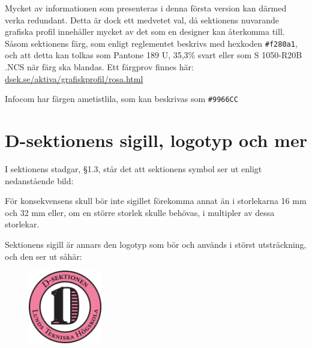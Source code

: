 \documentclass[]{dsekprotokoll}
\begin{document}
Mycket av informationen som presenteras i denna första version kan därmed verka redundant. Detta är dock ett medvetet val, då sektionens nuvarande grafiska profil innehåller mycket av det som en designer kan återkomma till. Såsom sektionens färg, som enligt reglementet beskrivs med hexkoden \texttt{\#f280a1}, och att detta kan tolkas som Pantone 189 U, 35,3\% svart eller som S 1050-R20B .NCS när färg ska blandas.
Ett färgprov finnes här: \\ \href{https://www.dsek.se/aktiva/grafiskprofil/rosa.html}{dsek.se/aktiva/grafiskprofil/rosa.html}

Infocom har färgen ametistlila, som kan beskrivas som \texttt{\#9966CC}



\section{D-sektionens sigill, logotyp och mer}
I sektionens stadgar, §1.3, står det att sektionens symbol ser ut enligt nedanstående bild:
\begin{figure} [!hbp]
    \centering
    \Dsymbol[32mm]
\end{figure}

För konsekvensens skull bör inte sigillet förekomma annat än i storlekarna 16 mm och 32 mm eller, om en större storlek skulle behövas, i multipler av dessa storlekar.

Sektionens sigill är annars den logotyp som bör och används i störst utsträckning, och den ser ut såhär:
\begin{figure}[!hbp]
    \centering
    \Dlogo[32mm] \includegraphics[height=32mm]{D-logo-org-col.pdf}
    \label{fig:my_label}
\end{figure}
\end{document}

